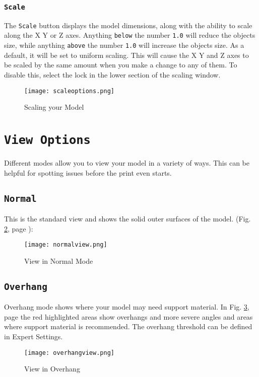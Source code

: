 \subsubsection{\texttt{Scale}}
The \texttt{Scale} button displays the model dimensions, along with the ability to scale along the X Y or Z axes. Anything \texttt{below} the number \texttt{1.0} will reduce the objects size, while anything \texttt{above} the number \texttt{1.0} will increase the objects size. As a default, it will be set to uniform scaling. This will cause the X Y and Z axes to be scaled by the same amount when you make a change to any of them. To disable this, select the lock in the lower section of the scaling window. 
\begin{figure}[H]
\centering
\texttt{[image: scaleoptions.png]}
\caption{Scaling your Model}
\label{fig:Scaling your Model}
\end{figure}

\section{\texttt{View Options}}
Different modes allow you to view your model in a variety of ways. This can be helpful for spotting issues before the print even starts. 

\subsection{\texttt{Normal}}
This is the standard view and shows the solid outer surfaces of the model. (Fig. \ref{fig:Normal View}, page \pageref{fig:Normal View}): 

\begin{figure}[H]
\centering
\texttt{[image: normalview.png]}
\caption{View in Normal Mode}
\label{fig:Normal View}
\end{figure}

\subsection{\texttt{Overhang}}
Overhang mode shows where your model may need support material. In Fig. \ref{fig:Overhang_View}, page \pageref{fig:Overhang_View} the red highlighted areas show overhangs and more severe angles and areas where support material is recommended. The overhang threshold can be defined in Expert Settings. 
\begin{figure}[H]
\centering
\texttt{[image: overhangview.png]}
\caption{View in Overhang}
\label{fig:Overhang_View}
\end{figure}

